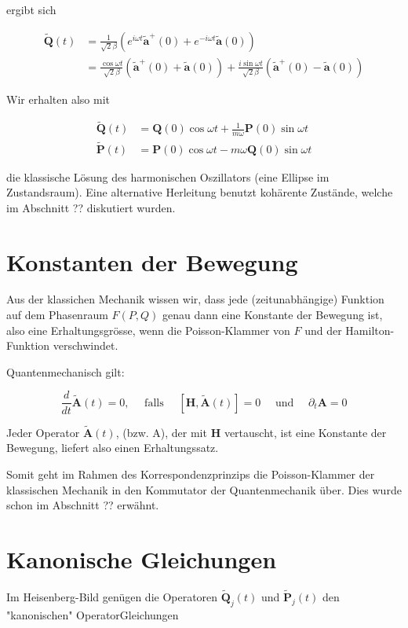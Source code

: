 \documentclass[10pt, letterpaper]{article}
\begin{document}
ergibt sich

$$
\begin{aligned}
\tilde{\mathbf{Q}}(t) & =\frac{1}{\sqrt{2} \beta}\left(e^{i \omega t} \tilde{\mathbf{a}}^{+}(0)+e^{-i \omega t} \tilde{\mathbf{a}}(0)\right) \\
& =\frac{\cos \omega t}{\sqrt{2} \beta}\left(\tilde{\mathbf{a}}^{+}(0)+\tilde{\mathbf{a}}(0)\right)+\frac{i \sin \omega t}{\sqrt{2} \beta}\left(\tilde{\mathbf{a}}^{+}(0)-\tilde{\mathbf{a}}(0)\right)
\end{aligned}
$$

Wir erhalten also mit

$$
\begin{aligned}
\tilde{\mathbf{Q}}(t) & =\mathbf{Q}(0) \cos \omega t+\frac{1}{m \omega} \mathbf{P}(0) \sin \omega t \\
\tilde{\mathbf{P}}(t) & =\mathbf{P}(0) \cos \omega t-m \omega \mathbf{Q}(0) \sin \omega t
\end{aligned}
$$

die klassische Lösung des harmonischen Oszillators (eine Ellipse im Zustandsraum). Eine alternative Herleitung benutzt kohärente Zustände, welche im Abschnitt ?? diskutiert wurden.

\section*{Konstanten der Bewegung}
Aus der klassichen Mechanik wissen wir, dass jede (zeitunabhängige) Funktion auf dem Phasenraum $F(P, Q)$ genau dann eine Konstante der Bewegung ist, also eine Erhaltungsgrösse, wenn die Poisson-Klammer von $F$ und der Hamilton-Funktion verschwindet.

Quantenmechanisch gilt:

$$
\frac{d}{d t} \tilde{\mathbf{A}}(t)=0, \quad \text { falls } \quad[\mathbf{H}, \tilde{\mathbf{A}}(t)]=0 \quad \text { und } \quad \partial_{t} \mathbf{A}=0
$$

Jeder Operator $\tilde{\mathbf{A}}(t)$, (bzw. A), der mit $\mathbf{H}$ vertauscht, ist eine Konstante der Bewegung, liefert also einen Erhaltungssatz.

Somit geht im Rahmen des Korrespondenzprinzips die Poisson-Klammer der klassischen Mechanik in den Kommutator der Quantenmechanik über. Dies wurde schon im Abschnitt ?? erwähnt.

\section*{Kanonische Gleichungen}
Im Heisenberg-Bild genügen die Operatoren $\tilde{\mathbf{Q}}_{j}(t)$ und $\tilde{\mathbf{P}}_{j}(t)$ den "kanonischen" OperatorGleichungen
\end{document}
